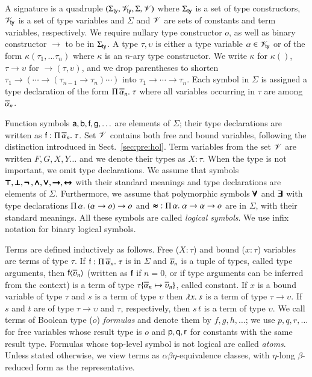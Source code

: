 A signature is a quadruple $(\Sigma_\mathsf{ty}, \mathscr{V}_\mathsf{ty}, \Sigma, \mathscr{V})$ where $\Sigma_\mathsf{ty}$ is a
set of type constructors, $\mathscr{V}_\mathsf{ty}$ is a set of type variables and $\Sigma$ and
$\mathscr{V}$ are sets of constants and term variables, respectively. We require nullary
type constructor $o$, as well as binary constructor $\rightarrow$
to be in $\Sigma_\mathsf{ty}$. A type $\tau, \upsilon$ is either a type variable $\alpha \in
\mathscr{V}_\mathsf{ty}$ or of the form $\kappa(\tau_1, \ldots \tau_n)$ where $\kappa$ is an
$n$-ary type constructor. We write $\kappa$ for $\kappa()$, $\tau \rightarrow
\upsilon$ for $\rightarrow(\tau, \upsilon)$, and we drop parentheses to shorten 
$\tau_1 \rightarrow (\cdots \rightarrow (\tau_{n-1} \rightarrow \tau_n) \cdots)$ into $\tau_1 \rightarrow \cdots \rightarrow
\tau_n$. Each symbol in $\Sigma$ is
assigned a type declaration of the form $\Pi\,\overline{\alpha}_{n}.\; \tau$ where all variables
occurring in $\tau$ are among $\overline{\alpha}_{n}$.

Function symbols $\mathsf{a}, \mathsf{b}, \mathsf{f}, \mathsf{g}, \ldots$ are elements of
$\Sigma$; their type declarations are written as $\mathsf{f} :
\Pi\,\overline{\alpha}_{n}.\; \tau$. Set $\mathscr{V}$ contains both free and bound variables, following
the distinction introduced in Sect.~\ref{sec:pre:hol}. Term variables from the set $\mathscr{V}$ are written
$F,G,X,Y \ldots$ and we denote their types as $X : \tau$. When the type is not
important, we omit type declarations. We assume that symbols $\pmb\top,
\pmb\bot,\pmb{\neg\,},\pmb\land, \pmb\lor,\pmb\rightarrow,\pmb\leftrightarrow$ with their standard meanings and type declarations are elements of
$\Sigma$. Furthermore, we assume that polymorphic symbols $\pmb\forall$ and $\pmb\exists$
with type declarations $\Pi\,\alpha.\; (\alpha \rightarrow o) \rightarrow o$
and $\pmb\approx \; : \Pi\,\alpha.\; {\alpha \rightarrow \alpha \rightarrow o}$ are
in $\Sigma$, with their standard meanings. All these symbols are called \emph{logical
symbols}. We use infix notation for binary logical symbols.

 Terms are defined inductively as follows. Free ($X : \tau$)  and bound ($x : \tau$) variables   are
terms of type $\tau$. If $\mathsf{f} : \Pi\,\overline{\alpha}_{n}.\; \tau$ is in
$\Sigma$ and $\overline{\upsilon}_{n}$ is a tuple of types, called type arguments, then
$\mathsf{f}{\langle\overline{\upsilon}_{n}\rangle}$ (written as $\mathsf{f}$ if $n=0$, or if type
arguments can be inferred from the context) is a term of type $\tau \{
\overline{\alpha}_{n} \mapsto \overline{\upsilon}_{n} \}$, called constant. If $x$ is a bound variable
of type $\tau$ and $s$ is a term of type $\upsilon$ then $\lambda x.\> s$ is a term of type
$\tau \rightarrow \upsilon$. If $s$ and $t$ are of type $\tau \rightarrow \upsilon$ and
$\tau$, respectively, then $s \, t$ is a term of type $\upsilon$. We call terms of
Boolean type ($o$) \emph{formulas} and denote them by $f,g,h, \ldots$; we use
$p,q,r, \ldots$ for free variables whose result type is $o$ and
$\mathsf{p},\mathsf{q},\mathsf{r}$ for constants with the same result type.
%
Formulas whose top-level symbol is not logical are called \emph{atoms}.
Unless stated otherwise, we view terms as
$\alpha\beta\eta$-equivalence classes, with $\eta$-long $\beta$-reduced form as
the representative. 

